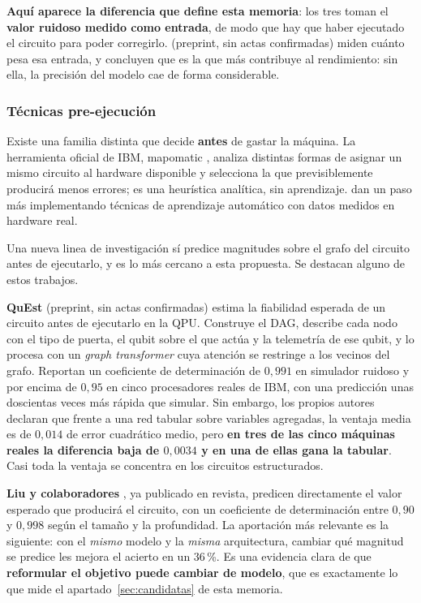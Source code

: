 \textbf{Aquí aparece la diferencia que define esta memoria}: los tres toman el \textbf{valor
ruidoso medido como entrada}, de modo que hay que haber ejecutado el circuito para poder
corregirlo.  (preprint, sin actas
confirmadas) miden cuánto pesa esa entrada, y concluyen que es la que más
contribuye al rendimiento: sin ella, la precisión del modelo cae de forma considerable.

\subsubsection*{Técnicas pre-ejecución}

Existe una familia distinta que decide \textbf{antes} de gastar la máquina. La herramienta
oficial de IBM, mapomatic \cite{nation2023suppressing}, analiza distintas formas de asignar un mismo circuito al hardware disponible y selecciona la que previsiblemente producirá menos errores; es una
heurística analítica, sin aprendizaje.  dan un paso más implementando técnicas de aprendizaje
automático con datos medidos en hardware real.

Una nueva linea de investigación sí predice magnitudes sobre el grafo del circuito antes de ejecutarlo, y es
lo más cercano a esta propuesta. Se destacan alguno de estos trabajos.

\textbf{QuEst} \cite{wang2025quest} (preprint, sin actas confirmadas) estima la fiabilidad
esperada de un circuito antes de ejecutarlo en la QPU. Construye el DAG, describe cada nodo con el
tipo de puerta, el qubit sobre el que actúa y la telemetría de ese qubit, y lo procesa con un
\textit{graph transformer} cuya atención se restringe a los vecinos del grafo. Reportan un
coeficiente de determinación de $0{,}991$ en simulador ruidoso y por encima de $0{,}95$ en cinco
procesadores reales de IBM, con una predicción unas doscientas veces más rápida que simular.
Sin embargo, los propios autores declaran que frente a una red tabular sobre variables
agregadas, la ventaja media es de $0{,}014$ de error cuadrático medio, pero \textbf{en tres de
las cinco máquinas reales la diferencia baja de $0{,}0034$ y en una de ellas gana la tabular}.
Casi toda la ventaja se concentra en los circuitos estructurados.

\textbf{Liu y colaboradores} \cite{liu2026output}, ya publicado en revista, predicen
directamente el valor esperado que producirá el circuito, con un coeficiente de determinación
entre $0{,}90$ y $0{,}998$ según el tamaño y la profundidad. La aportación más relevante es la siguiente: con el \emph{mismo} modelo y la \emph{misma}
arquitectura, cambiar qué magnitud se predice les mejora el acierto en un $36$\,\%. Es una
evidencia clara de que \textbf{reformular el objetivo puede cambiar de modelo}, que es
exactamente lo que mide el apartado~\ref{sec:candidatas} de esta memoria.

